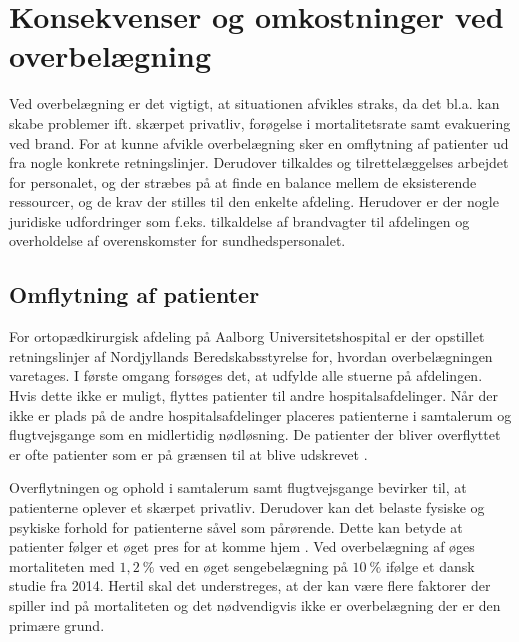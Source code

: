 \section{Konsekvenser og omkostninger ved overbelægning}
Ved overbelægning er det vigtigt, at situationen afvikles straks, da det bl.a. kan skabe problemer ift. skærpet privatliv, forøgelse i mortalitetsrate samt evakuering ved brand. \cite{Madsen2014} For at kunne afvikle overbelægning sker en omflytning af patienter ud fra nogle konkrete retningslinjer. \cite{Beredskab2016} Derudover tilkaldes og tilrettelæggelses arbejdet for personalet, og der stræbes på at finde en balance mellem de eksisterende ressourcer, og de krav der stilles til den enkelte afdeling. \cite{Bjerg2016} Herudover er der nogle juridiske udfordringer som f.eks. tilkaldelse af brandvagter til afdelingen og overholdelse af overenskomster for sundhedspersonalet. \cite{Beredskab2016}


\subsection{Omflytning af patienter}
For ortopædkirurgisk afdeling på Aalborg Universitetshospital er der opstillet retningslinjer af Nordjyllands Beredskabsstyrelse for, hvordan overbelægningen varetages. I første omgang forsøges det, at udfylde alle stuerne på afdelingen. Hvis dette ikke er muligt, flyttes patienter til andre hospitalsafdelinger. Når der ikke er plads på de andre hospitalsafdelinger placeres patienterne i samtalerum og flugtvejsgange som en midlertidig nødløsning. \cite{Beredskab2016} De patienter der bliver overflyttet er ofte patienter som er på grænsen til at blive udskrevet .


Overflytningen og ophold i samtalerum samt flugtvejsgange bevirker til, at patienterne oplever et skærpet privatliv. \cite{Madsen2014} Derudover kan det belaste fysiske og psykiske forhold for patienterne såvel som pårørende. \cite{Heidmann2014} Dette kan betyde at patienter følger et øget pres for at komme hjem . Ved overbelægning af øges mortaliteten med $1,2~\%$ ved en øget sengebelægning på $10~\%$ ifølge et dansk studie fra 2014. \cite{Madsen2014} Hertil skal det understreges, at der kan være flere faktorer der spiller ind på mortaliteten og det nødvendigvis ikke er overbelægning der er den primære grund. 


